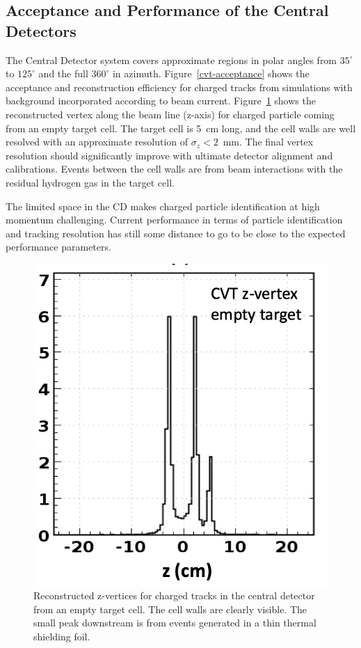 \documentclass[final,3p,twocolumn]{elsarticle}
\begin{document}
\subsection{Acceptance and Performance of the Central Detectors} 

The Central Detector system covers approximate regions in polar angles from $35^\circ$ to $125^\circ$ and the
full $360^\circ$ in azimuth.  Figure~\ref{cvt-acceptance} shows the acceptance and reconstruction efficiency for
charged tracks from simulations with background incorporated according to beam current. Figure~\ref{cvt-vertex} 
shows the reconstructed vertex along the beam line (z-axis) for charged particle coming from an empty 
target cell. The target cell is 5~cm long, and the cell walls are well resolved with an approximate resolution 
of $\sigma_z<2$~mm. The final vertex resolution should significantly improve with ultimate detector alignment and 
calibrations. Events between the cell walls are from beam interactions with the residual hydrogen gas in the target cell.  

The limited space in the CD makes charged particle identification at high
momentum challenging. Current performance in terms of particle identification and tracking resolution has still some
distance to go to be close to the expected performance parameters.   

\begin{figure}[thbp!]
\centerline{\includegraphics[width=0.8\columnwidth]{cvt-vertex.png}}
\caption{Reconstructed z-vertices for charged tracks in the central detector from an empty target cell. The cell walls are 
clearly visible. The small peak downstream is from events generated in a thin thermal shielding foil.  }
\label{cvt-vertex}
\end{figure}
\end{document}
